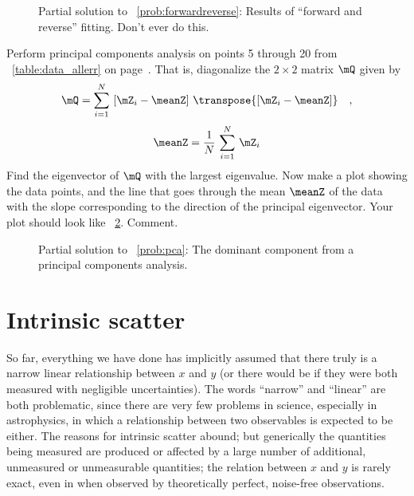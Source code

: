 \documentclass[12pt,twoside,pdftex]{article}
\begin{document}
\begin{figure}[htbp]
\caption{Partial solution to \problemname~\ref{prob:forwardreverse}:
  Results of ``forward and reverse'' fitting.  Don't ever do
  this.}\label{fig:forwardreverse}
\end{figure}

\begin{problem}\label{prob:pca}
Perform principal components analysis on points 5 through 20 from
\tablename~\ref{table:data_allerr} on
page~\pageref{table:data_allerr}.  That is, diagonalize the $2\times
2$ matrix $\mQ$ given by
\begin{equation}
\mQ = \sum_{i=1}^N\,\left[\mZ_i-\meanZ\right]
  \,\transpose{\left[\mZ_i-\meanZ\right]} \quad ,
\end{equation}
\begin{equation}
\meanZ = \frac{1}{N}\,\sum_{i=1}^N\,\mZ_i
\end{equation}
Find the eigenvector of $\mQ$ with the largest eigenvalue.  Now make a
plot showing the data points, and the line that goes through the mean
$\meanZ$ of the data with the slope corresponding to the direction of
the principal eigenvector.  Your plot should look like
\figurename~\ref{fig:pca}.  Comment.
\end{problem}

\begin{figure}[htbp]
\caption{Partial solution to \problemname~\ref{prob:pca}: The dominant
component from a principal components analysis.}\label{fig:pca}
\end{figure}

\section{Intrinsic scatter}\label{sec:scatter}

So far, everything we have done has implicitly assumed that there
truly is a narrow linear relationship between $x$ and $y$ (or there
would be if they were both measured with negligible uncertainties).
The words ``narrow'' and ``linear'' are both problematic, since there
are very few problems in science, especially in astrophysics, in which
a relationship between two observables is expected to be either.  The
reasons for intrinsic scatter abound; but generically the quantities
being measured are produced or affected by a large number of
additional, unmeasured or unmeasurable quantities; the relation
between $x$ and $y$ is rarely exact, even in when observed by
theoretically perfect, noise-free observations.
\end{document}
